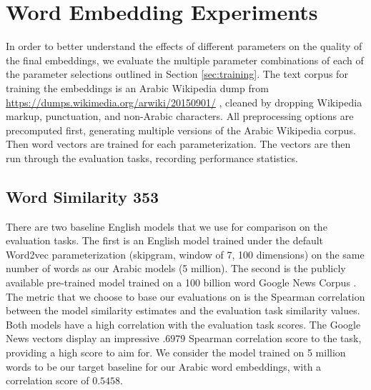 
\section{Word Embedding Experiments}
\label{sec:experiments}

In order to better understand the effects of different parameters on the quality of the final embeddings, we evaluate the multiple parameter combinations of each of the parameter selections outlined in Section \ref{sec:training}. The text corpus for training the embeddings is an Arabic Wikipedia dump from \url{https://dumps.wikimedia.org/arwiki/20150901/} \cite{wiki:xxx}, cleaned by dropping Wikipedia markup, punctuation, and non-Arabic characters. All preprocessing options are precomputed first, generating multiple versions of the Arabic Wikipedia corpus. Then word vectors are trained for each parameterization. The vectors are then run through the evaluation tasks, recording performance statistics.

\subsection{Word Similarity 353}

There are two baseline English models that we use for comparison on the evaluation tasks. The first is an English model trained under the default Word2vec parameterization (skipgram, window of 7, 100 dimensions) on the same number of words as our Arabic models (5 million). The second is the publicly available pre-trained model trained on a 100 billion word Google News Corpus \cite{mikolovdist:2013}. The metric that we choose to base our evaluations on is the Spearman correlation between the model similarity estimates and the evaluation task similarity values. Both models have a high correlation with the evaluation task scores. The Google News vectors display an impressive $.6979$ Spearman correlation score to the task, providing a high score to aim for. We consider the model trained on 5 million words to be our target baseline for our Arabic word embeddings, with a correlation score of $0.5458$.

